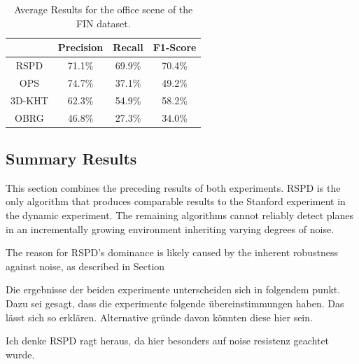 \documentclass[main.tex]{subfiles}
\begin{document}
\begin{table}[]
    \centering
    \begin{tabular}{c|ccc}
               & Precision & Recall & F1-Score \\ \hline
        RSPD   & 71.1\%    & 69.9\% & 70.4\%   \\
        OPS    & 74.7\%    & 37.1\% & 49.2\%   \\
        3D-KHT & 62.3\%    & 54.9\% & 58.2\%   \\
        OBRG   & 46.8\%    & 27.3\% & 34.0\%
    \end{tabular}
    \caption{Average Results for the office scene of the FIN dataset.}
    \label{tab:res-fin-off}
\end{table}

\subsection{Summary Results}
This section combines the preceding results of both experiments.
RSPD is the only algorithm that produces comparable results to the Stanford experiment in the dynamic experiment.
The remaining algorithms cannot reliably detect planes in an incrementally growing environment inheriting varying degrees of noise.

The reason for RSPD's dominance is likely caused by the inherent robustness against noise, as described in Section~

Die ergebnisse der beiden experimente unterscheiden sich in folgendem punkt. Dazu sei gesagt, dass die experimente folgende übereinstimmungen haben.
Das lässt sich so erklären. Alternative gründe davon könnten diese hier sein.

Ich denke RSPD ragt heraus, da hier besonders auf noise resistenz geachtet wurde. %
\end{document}
